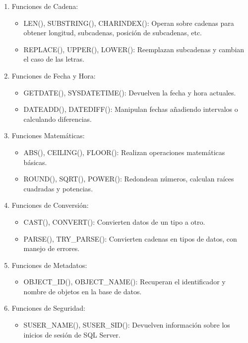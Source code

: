 \documentclass[a4paper,openany,11pt]{article}
\begin{document}
\begin{enumerate}
    \begin{enumerate}
        \item Funciones de Cadena:
        \begin{itemize}
            \item LEN(), SUBSTRING(), CHARINDEX(): Operan sobre cadenas
                para obtener longitud, subcadenas, posición de subcadenas,
                etc.
            \item REPLACE(), UPPER(), LOWER(): Reemplazan subcadenas y
                cambian el caso de las letras.
        \end{itemize}

        \item Funciones de Fecha y Hora:
        \begin{itemize}
            \item GETDATE(), SYSDATETIME(): Devuelven la fecha y hora actuales.
            \item DATEADD(), DATEDIFF(): Manipulan fechas añadiendo intervalos
                o calculando diferencias.
        \end{itemize}

        \item Funciones Matemáticas:
        \begin{itemize}
            \item ABS(), CEILING(), FLOOR(): Realizan operaciones matemáticas
                básicas.
            \item ROUND(), SQRT(), POWER(): Redondean números, calculan raíces
                cuadradas y potencias.
        \end{itemize}

        \item Funciones de Conversión:
        \begin{itemize}
            \item CAST(), CONVERT(): Convierten datos de un tipo a otro.
            \item PARSE(), TRY\_PARSE(): Convierten cadenas en tipos de datos, con manejo de errores.
        \end{itemize}

        \item Funciones de Metadatos:
        \begin{itemize}
            \item OBJECT\_ID(), OBJECT\_NAME(): Recuperan el identificador y
                nombre de objetos en la base de datos.
        \end{itemize}

        \item Funciones de Seguridad:
        \begin{itemize}
            \item SUSER\_NAME(), SUSER\_SID(): Devuelven información sobre los
                inicios de sesión de SQL Server.
        \end{itemize}
    \end{enumerate}
\end{enumerate}
\end{document}
